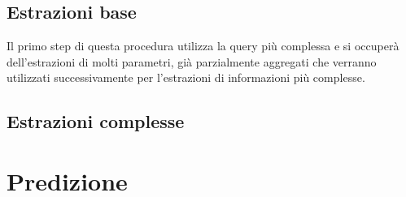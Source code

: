 \documentclass[%
    corpo=12pt,
    twoside,
    oldstyle,
    autoretitolo,
    greek,
    evenboxes,
]{toptesi}
\begin{document}
\section{Estrazioni base}
Il primo step di questa procedura utilizza la query più complessa e si occuperà dell'estrazioni di molti parametri, già parzialmente aggregati che verranno utilizzati successivamente per l'estrazioni di informazioni più complesse.

\section{Estrazioni complesse}



\chapter{Predizione}
\label{chap:forecasting}

\end{document}
